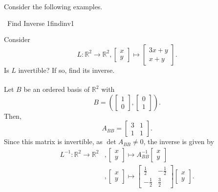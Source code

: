         \pagebreak
        \vphantom
        \\
        \\
        Consider the following examples.
        \begin{example}{\Difficulty\,\Difficulty\,\,Find Inverse 1}{findinv1}

            Consider
            \begin{equation*}
                L:\mathbb{R}^2\to\mathbb{R}^2,\begin{bmatrix} x \\ y \end{bmatrix}\mapsto\begin{bmatrix} 3x+y \\ x+y \end{bmatrix}.
            \end{equation*}
            Is \(L\) invertible? If so, find its inverse.
            \\
            \\
            Let \(B\) be an ordered basis of \(\mathbb{R}^2\) with
            \begin{equation*}
                B=\left(\begin{bmatrix} 1 \\ 0 \end{bmatrix}, \begin{bmatrix} 0 \\ 1 \end{bmatrix} \right).
            \end{equation*}
            Then,
            \begin{equation*}
                A_{BB}=\begin{bmatrix} 3 & 1 \\ 1 & 1 \end{bmatrix}.
            \end{equation*}
            Since this matrix is invertible, as \(\det A_{BB}\neq 0\), the inverse is given by
            \begin{align*}
                L^{-1}:\mathbb{R}^2\to\mathbb{R}^2&,\begin{bmatrix} x \\ y \end{bmatrix}\mapsto A_{BB}^{-1}\begin{bmatrix} x \\ y \end{bmatrix} \\
                &,\begin{bmatrix} x \\ y \end{bmatrix}\mapsto \begin{bmatrix} \frac{1}{2} & -\frac{1}{2} \\ -\frac{1}{2} & \frac{3}{2} \end{bmatrix}\begin{bmatrix} x \\ y \end{bmatrix}.
            \end{align*}
        \end{example}
